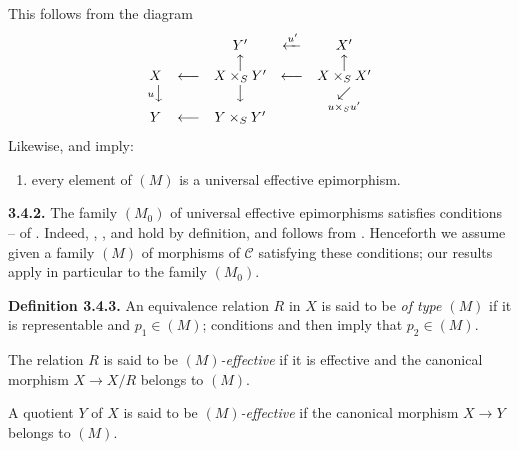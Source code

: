 This follows from the diagram
\[
\begin{array}{ccccc}
  &&Y'&\xleftarrow{u'}&X'\\
  &&\big\uparrow&&\big\uparrow\\[-2pt]
  X&\longleftarrow&X\times_S Y'&\longleftarrow&X\times_S X'\\
  {\scriptstyle u}\big\downarrow&&\big\downarrow&&
    \underset{\scriptstyle u\times_Su'}{\swarrow}\\[-2pt]
  Y&\longleftarrow&Y\times_S Y'&&
\end{array}
\]
Likewise,  and  imply:
\begin{enumerate}
  \item[(d$'$)] every element of \((M)\) is a universal effective
  epimorphism.
\end{enumerate}

\medskip
\noindent{}\textbf{3.4.2.}
The family \((M_0)\) of universal effective epimorphisms satisfies
conditions -- of . Indeed, , , and  hold by definition,
and  follows from . Henceforth we assume given a family \((M)\) of
morphisms of \(\mathscr C\) satisfying these conditions; our results apply
in particular to the family \((M_0)\).

\medskip
\noindent{}\textbf{Definition 3.4.3.}
An equivalence relation \(R\) in \(X\) is said to be \emph{of type \((M)\)}
if it is representable and \(p_1\in(M)\); conditions  and  then imply
that \(p_2\in(M)\).

The relation \(R\) is said to be \emph{\((M)\)-effective} if it is effective
and the canonical morphism \(X\to X/R\) belongs to \((M)\).

A quotient \(Y\) of \(X\) is said to be \emph{\((M)\)-effective} if the
canonical morphism \(X\to Y\) belongs to \((M)\).

